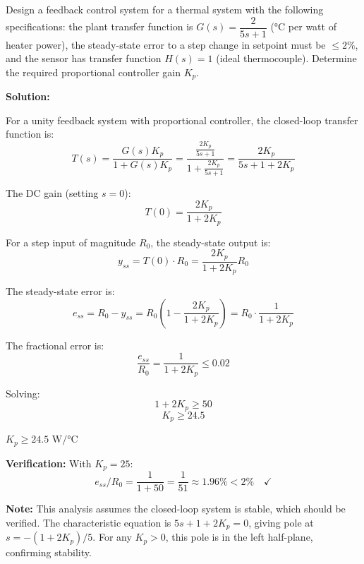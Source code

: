 \begin{example}
\label{ex:design}
Design a feedback control system for a thermal system with the following specifications: the plant transfer function is $G(s) = \dfrac{2}{5s + 1}$ (°C per watt of heater power), the steady-state error to a step change in setpoint must be $\leq 2\%$, and the sensor has transfer function $H(s) = 1$ (ideal thermocouple). Determine the required proportional controller gain $K_p$.

\textbf{Solution:}

For a unity feedback system with proportional controller, the closed-loop transfer function is:
\begin{equation*}
T(s) = \frac{G(s) K_p}{1 + G(s) K_p} = \frac{\frac{2K_p}{5s+1}}{1 + \frac{2K_p}{5s+1}} = \frac{2K_p}{5s + 1 + 2K_p}
\end{equation*}

The DC gain (setting $s = 0$):
\begin{equation*}
T(0) = \frac{2K_p}{1 + 2K_p}
\end{equation*}

For a step input of magnitude $R_0$, the steady-state output is:
\begin{equation*}
y_{ss} = T(0) \cdot R_0 = \frac{2K_p}{1 + 2K_p} R_0
\end{equation*}

The steady-state error is:
\begin{equation*}
e_{ss} = R_0 - y_{ss} = R_0 \left(1 - \frac{2K_p}{1 + 2K_p}\right) = R_0 \cdot \frac{1}{1 + 2K_p}
\end{equation*}

The fractional error is:
\begin{equation*}
\frac{e_{ss}}{R_0} = \frac{1}{1 + 2K_p} \leq 0.02
\end{equation*}

Solving:
\begin{equation*}
1 + 2K_p \geq 50
\end{equation*}
\begin{equation*}
K_p \geq 24.5
\end{equation*}

$\boxed{K_p \geq 24.5 \text{ W/°C}}$

\textbf{Verification:} With $K_p = 25$:
\begin{equation*}
e_{ss}/R_0 = \frac{1}{1 + 50} = \frac{1}{51} \approx 1.96\% < 2\% \quad \checkmark
\end{equation*}

\textbf{Note:} This analysis assumes the closed-loop system is stable, which should be verified. The characteristic equation is $5s + 1 + 2K_p = 0$, giving pole at $s = -(1 + 2K_p)/5$. For any $K_p > 0$, this pole is in the left half-plane, confirming stability.
\end{example}

